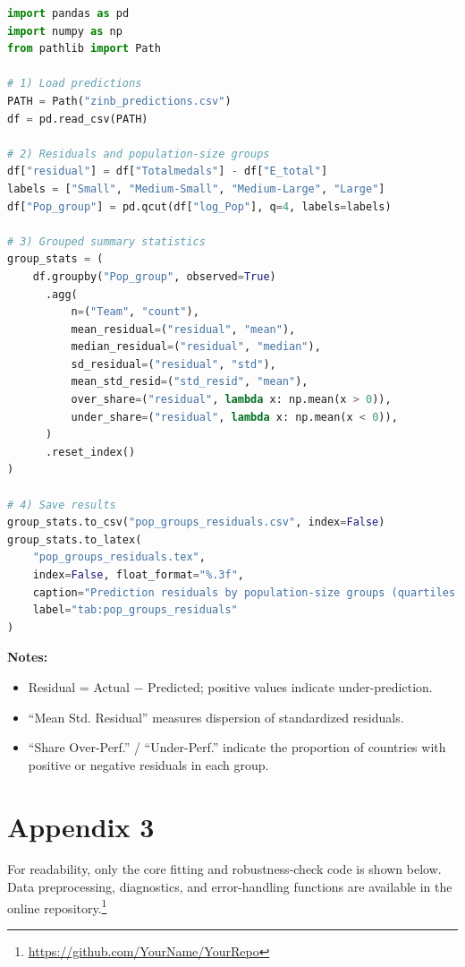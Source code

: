 \documentclass[11pt,twoside]{article}
\numberwithin{Theorem}{section}
\numberwithin{Definition}{section}
\numberwithin{Lemma}{section}
\numberwithin{Algorithm}{section}
\numberwithin{equation}{section}
\begin{document}
\begin{lstlisting}[language=Python, caption={Grouped residuals by population size}, label={lst:pop_groups}]
import pandas as pd
import numpy as np
from pathlib import Path

# 1) Load predictions
PATH = Path("zinb_predictions.csv") 
df = pd.read_csv(PATH)

# 2) Residuals and population-size groups
df["residual"] = df["Totalmedals"] - df["E_total"]
labels = ["Small", "Medium-Small", "Medium-Large", "Large"]
df["Pop_group"] = pd.qcut(df["log_Pop"], q=4, labels=labels)

# 3) Grouped summary statistics
group_stats = (
    df.groupby("Pop_group", observed=True)
      .agg(
          n=("Team", "count"),
          mean_residual=("residual", "mean"),
          median_residual=("residual", "median"),
          sd_residual=("residual", "std"),
          mean_std_resid=("std_resid", "mean"),
          over_share=("residual", lambda x: np.mean(x > 0)),
          under_share=("residual", lambda x: np.mean(x < 0)),
      )
      .reset_index()
)

# 4) Save results
group_stats.to_csv("pop_groups_residuals.csv", index=False)
group_stats.to_latex(
    "pop_groups_residuals.tex",
    index=False, float_format="%.3f",
    caption="Prediction residuals by population-size groups (quartiles of log population).",
    label="tab:pop_groups_residuals"
)
\end{lstlisting}

\noindent\textbf{Notes:}
\begin{itemize}
    \item Residual = Actual $-$ Predicted; positive values indicate under-prediction.  
    \item ``Mean Std. Residual'' measures dispersion of standardized residuals.  
    \item ``Share Over-Perf.'' / ``Under-Perf.'' indicate the proportion of countries 
          with positive or negative residuals in each group.  
\end{itemize}

\clearpage

\section{Appendix 3}
\label{app:one}

For readability, only the core fitting and robustness-check code is shown below.  
Data preprocessing, diagnostics, and error-handling functions are available in the 
online repository.\footnote{\url{https://github.com/YourName/YourRepo}}  
\end{document}

